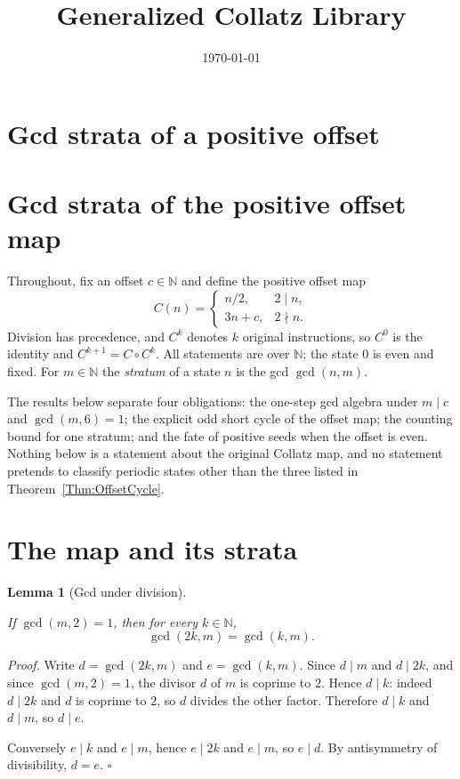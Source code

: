 \documentclass[11pt,letterpaper]{article}
\title{Generalized Collatz Library}
\author{}
\date{\today}
\newcommand{\N}{\mathbb{N}}
\newtheorem{lemma}[theorem]{Lemma}
\newenvironment{proof}{\noindent\textit{Proof.}}{\hfill\(\square\)}
\begin{document}
\maketitle
\section*{Gcd strata of a positive offset}

\section*{Gcd strata of the positive offset map}

Throughout, fix an offset $c\in\N$ and define the positive offset map
\[
 C(n)=\begin{cases}n/2,&2\mid n,\\ 3n+c,&2\nmid n.\end{cases}
\]
Division has precedence, and $C^{k}$ denotes $k$ original instructions, so
$C^{0}$ is the identity and $C^{k+1}=C\circ C^{k}$. All statements are over
$\N$; the state $0$ is even and fixed. For $m\in\N$ the \emph{stratum} of a
state $n$ is the gcd $\gcd(n,m)$.

The results below separate four obligations: the one-step gcd algebra under
$m\mid c$ and $\gcd(m,6)=1$; the explicit odd short cycle of the offset map;
the counting bound for one stratum; and the fate of positive seeds when the
offset is even. Nothing below is a statement about the original Collatz map,
and no statement pretends to classify periodic states other than the three
listed in Theorem~\ref{Thm:OffsetCycle}.

\section{The map and its strata}

\begin{lemma}[Gcd under division]\label{Lem:OffsetTwoMulGcd}
\leavevmode\par
If $\gcd(m,2)=1$, then for every $k\in\N$,
\[
 \gcd(2k,m)=\gcd(k,m).
\]
\end{lemma}

\begin{proof}
Write $d=\gcd(2k,m)$ and $e=\gcd(k,m)$. Since $d\mid m$ and $d\mid 2k$, and
since $\gcd(m,2)=1$, the divisor $d$ of $m$ is coprime to $2$. Hence
$d\mid k$: indeed $d\mid 2k$ and $d$ is coprime to $2$, so $d$ divides the
other factor. Therefore $d\mid k$ and $d\mid m$, so $d\mid e$.

Conversely $e\mid k$ and $e\mid m$, hence $e\mid 2k$ and $e\mid m$, so
$e\mid d$. By antisymmetry of divisibility, $d=e$.
\end{proof}
\end{document}

